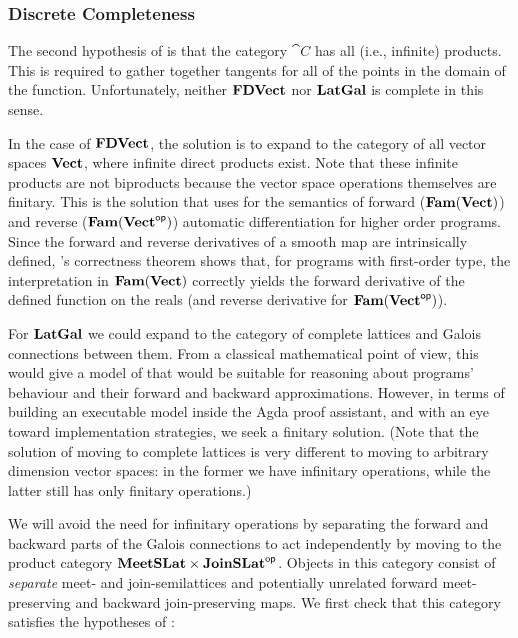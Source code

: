 \subsubsection{Discrete Completeness}
\label{sec:fixing-completeness}

The second hypothesis of  is that the category
$\cat{C}$ has all (i.e., infinite) products. This is required to
gather together tangents for all of the points in the domain of the
function. Unfortunately, neither $\mathbf{FDVect}$ nor $\mathbf{LatGal}$ is complete
in this sense.

In the case of $\mathbf{FDVect}$, the solution is to expand to the category
of all vector spaces $\mathbf{Vect}$, where infinite direct products
exist. Note that these infinite products are not biproducts because
the vector space operations themselves are finitary. This is the
solution that \cite{vakar22} uses for the semantics of forward
($\mathbf{Fam}(\mathbf{Vect})$) and reverse ($\mathbf{Fam}(\mathbf{Vect}^{\mathsf{op}})$) automatic
differentiation for higher order programs. Since the forward and
reverse derivatives of a smooth map are intrinsically defined,
\citet{vakar22}'s correctness theorem shows that, for programs with
first-order type, the interpretation in $\mathbf{Fam}(\mathbf{Vect})$ correctly yields
the forward derivative of the defined function on the reals (and
reverse derivative for $\mathbf{Fam}(\mathbf{Vect}^{\mathsf{op}})$).

For $\mathbf{LatGal}$ we could expand to the category of complete lattices and
Galois connections between them. From a classical mathematical point
of view, this would give a model of \GPS that would be suitable for
reasoning about programs' behaviour and their forward and backward
approximations. However, in terms of building an executable model
inside the Agda proof assistant, and with an eye toward implementation
strategies, we seek a finitary solution. (Note that the solution of
moving to complete lattices is very different to moving to arbitrary
dimension vector spaces: in the former we have infinitary operations,
while the latter still has only finitary operations.)

We will avoid the need for infinitary operations by separating the
forward and backward parts of the Galois connections to act
independently by moving to the product category
$\mathbf{MeetSLat} \times \mathbf{JoinSLat}^{\mathsf{op}}$. Objects in this category consist of
\emph{separate} meet- and join-semilattices and potentially unrelated
forward meet-preserving and backward join-preserving maps. We first
check that this category satisfies the hypotheses of
:

